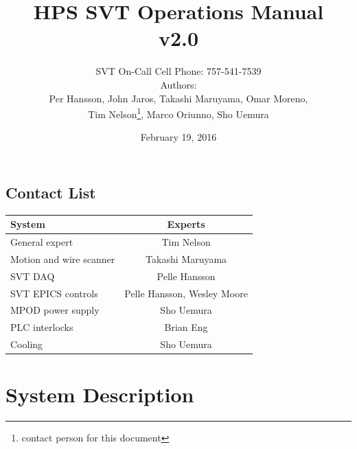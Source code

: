 \documentclass[12pt]{report}
\title{HPS SVT Operations Manual \\ v2.0}
\author{SVT On-Call Cell Phone: 757-541-7539 \\ 
Authors: \\
Per Hansson, John Jaros, Takashi Maruyama, Omar Moreno,\\ Tim Nelson\footnote{contact person for this document}, Marco Oriunno, Sho Uemura}
\date{February 19, 2016} %
\begin{document}
\maketitle

\tableofcontents

\newpage

\section{Contact List}

\begin{center}
\begin{tabular}{lc}
\hline \hline 
System & Experts \\
\hline
General expert & Tim Nelson \\
Motion and wire scanner & Takashi Maruyama \\
SVT DAQ & Pelle Hansson \\
SVT EPICS controls & Pelle Hansson, Wesley Moore \\
MPOD power supply & Sho Uemura \\
PLC interlocks & Brian Eng \\
Cooling & Sho Uemura \\
 \hline \hline
\end{tabular}
\end{center}

\chapter{System Description}
\end{document}
